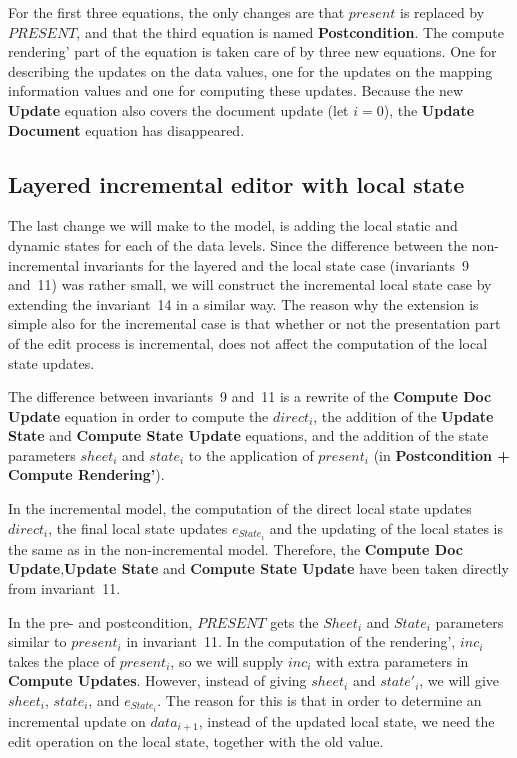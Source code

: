For the first three equations, the only changes are that $present$ is replaced by $PRESENT$, and that the third equation is named {\bf Postcondition}. The compute rendering' part of the equation is taken care of by three new equations. One for describing the updates on the data values, one for the updates on the mapping information values and one for computing these updates. Because the new {\bf Update} equation also covers the document update (let $i=0$), the {\bf Update Document} equation has disappeared.
\subsection{Layered incremental editor with local state}


The last change we will make to the model, is adding the local static and dynamic states for each of the data levels. Since the difference between the non-incremental invariants for the layered and the local state case (invariants~9 and~11) was rather small, we will construct the incremental local state case by extending the invariant~14 in a similar way. The reason why the extension is simple also for the incremental case is that whether or not the presentation part of the edit process is incremental, does not affect the computation of the local state updates.

The difference between invariants~9 and~11 is a rewrite of the {\bf Compute Doc Update} equation in order to compute the $direct_i$, the addition of the {\bf Update State} and {\bf Compute State Update} equations, and the addition of the state parameters $sheet_i$ and $state_i$ to the application of $present_i$ (in {\bf Postcondition + Compute Rendering'}).

In the incremental model, the computation of the direct local state updates $direct_i$, the final local state updates $e_{State_i}$ and the updating of the local states is the same as in the non-incremental model. Therefore, the {\bf Compute Doc Update},{\bf  Update State} and {\bf Compute State Update} have been taken directly from invariant~11. 

In the pre- and postcondition, $PRESENT$ gets the $Sheet_i$ and $State_i$ parameters similar to $present_i$ in invariant~11. In the computation of the rendering', $inc_i$ takes the place of $present_i$, so we will supply $inc_i$ with extra parameters in {\bf Compute Updates}. However, instead of giving $sheet_i$ and $state'_i$, we will give $sheet_i$, $state_i$, and $e_{State_i}$. The reason for this is that in order to determine an incremental update on $data_{i+1}$, instead of the updated local state, we need the edit operation on the local state, together with the old value.

